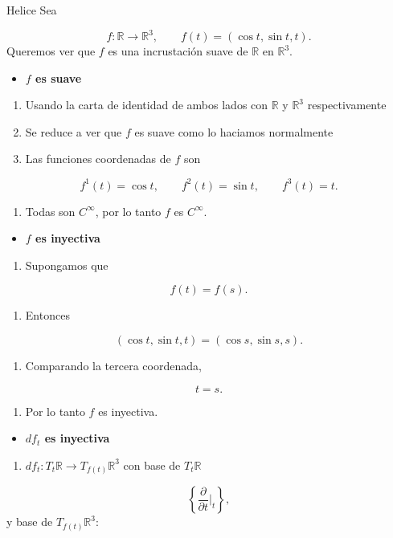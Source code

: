 \begin{bookexample}{Helice}
Sea

\[
f:\mathbb R\to\mathbb R^3,\qquad f(t)=(\cos t,\sin t,t).
\]
Queremos ver que $f$ es una incrustación suave de $\mathbb R$ en $\mathbb R^3$.

\end{bookexample}
\begin{bookproof}{}
\begin{itemize}
\item \textbf{$f$ es suave}
\end{itemize}
\begin{enumerate}
\item Usando la carta de identidad de ambos lados con $\mathbb{R}$ y $\mathbb{R}^{3}$ respectivamente
\item Se reduce a ver que $f$ es suave como lo haciamos normalmente
\item Las funciones coordenadas de $f$ son
\end{enumerate}
\[
f^1(t)=\cos t,\qquad f^2(t)=\sin t,\qquad f^3(t)=t.
\]
\begin{enumerate}[start=4]
\item Todas son $C^\infty$, por lo tanto $f$ es $C^\infty$.
\end{enumerate}
\begin{itemize}
\item \textbf{$f$ es inyectiva}
\end{itemize}
\begin{enumerate}
\item Supongamos que
\end{enumerate}
\[
f(t)=f(s).
\]
\begin{enumerate}[start=2]
\item Entonces
\end{enumerate}
\[
(\cos t,\sin t,t)=(\cos s,\sin s,s).
\]
\begin{enumerate}[start=3]
\item Comparando la tercera coordenada,
\end{enumerate}
\[
t=s.
\]
\begin{enumerate}[start=4]
\item Por lo tanto $f$ es inyectiva.
\end{enumerate}
\begin{itemize}
\item \textbf{$df_t$ es inyectiva}
\end{itemize}
\begin{enumerate}
\item $df_t:T_t\mathbb R\to T_{f(t)}\mathbb R^3$ con base de $T_t\mathbb R$
\end{enumerate}
\[
\left\{\frac{\partial}{\partial t}\bigg|_t\right\},
\]
y base de $T_{f(t)}\mathbb R^3$:


\end{bookproof}
